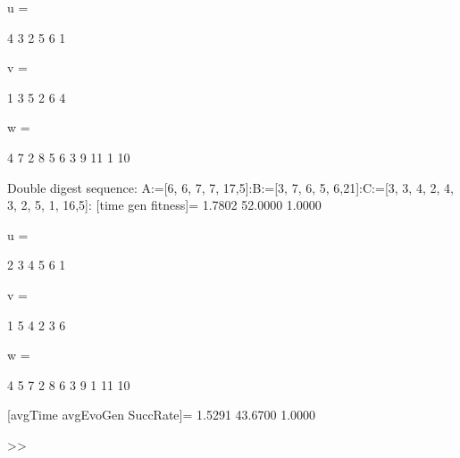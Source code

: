 u =

     4     3     2     5     6     1


v =

     1     3     5     2     6     4


w =

     4     7     2     8     5     6     3     9    11     1    10

Double digest sequence:
A:=[6, 6, 7, 7, 17,5]:B:=[3, 7, 6, 5, 6,21]:C:=[3, 3, 4, 2, 4, 3, 2, 5, 1, 16,5]:
[time gen fitness]=
    1.7802   52.0000    1.0000


u =

     2     3     4     5     6     1


v =

     1     5     4     2     3     6


w =

     4     5     7     2     8     6     3     9     1    11    10

[avgTime  avgEvoGen  SuccRate]=
    1.5291   43.6700    1.0000

>> 